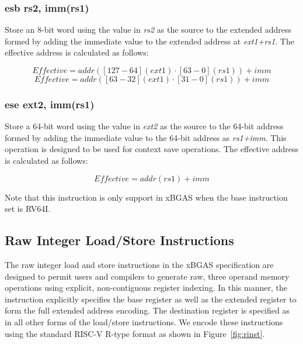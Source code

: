 \documentclass{article}
\begin{document}
\subsubsection{esb rs2, imm(rs1)}
Store an 8-bit word using the value in \textit{rs2} as the source 
to the extended address formed by adding the immediate value to the 
extended address at \textit{ext1+rs1}.  The effective address is calculated 
as follows: 

\begin{equation}
Effective = addr([127-64](ext1) \cdot [63-0](rs1))+imm
\end{equation}
\begin{equation}
Effective = addr([63-32](ext1) \cdot [31-0](rs1))+imm
\end{equation}

\subsubsection{ese ext2, imm(rs1)}
Store a 64-bit word using the value in \textit{ext2} as the source to the 
64-bit address formed by adding the immediate value to the 64-bit 
address as \textit{rs1+imm}.  This operation is designed to be used for 
context save operations.  The effective address is calculated as follows: 

\begin{equation}
Effective = addr(rs1)+imm
\end{equation}

\begin{commentary}
Note that this instruction is only support in xBGAS when the base 
instruction set is RV64I.
\end{commentary}

\subsection{Raw Integer Load/Store Instructions}
\label{sec:RawIntegerLoadStoreInstructions}

The raw integer load and store instructions in the xBGAS specification 
are designed to permit users and compilers to generate raw, three operand 
memory operations using explicit, non-contiguous register indexing.  In this manner, 
the instruction explicitly specifies the base register as well as the extended register 
to form the full extended address encoding.  The destination register is specified as 
in all other forms of the load/store instructions.  We encode these instructions 
using the standard RISC-V R-type format as shown in Figure~\ref{fig:rinst}.  
\end{document}
